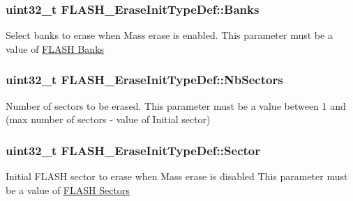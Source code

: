 \subsubsection[{\texorpdfstring{Banks}{Banks}}]{\setlength{\rightskip}{0pt plus 5cm}uint32\+\_\+t F\+L\+A\+S\+H\+\_\+\+Erase\+Init\+Type\+Def\+::\+Banks}\hypertarget{struct_f_l_a_s_h___erase_init_type_def_a9590db921fb8d36daf38e097f68fc14f}{}\label{struct_f_l_a_s_h___erase_init_type_def_a9590db921fb8d36daf38e097f68fc14f}
Select banks to erase when Mass erase is enabled. This parameter must be a value of \hyperlink{group___f_l_a_s_h_ex___banks}{F\+L\+A\+SH Banks} 
\subsubsection[{\texorpdfstring{Nb\+Sectors}{NbSectors}}]{\setlength{\rightskip}{0pt plus 5cm}uint32\+\_\+t F\+L\+A\+S\+H\+\_\+\+Erase\+Init\+Type\+Def\+::\+Nb\+Sectors}\hypertarget{struct_f_l_a_s_h___erase_init_type_def_aec98fec1676cd618e3743158c855a76a}{}\label{struct_f_l_a_s_h___erase_init_type_def_aec98fec1676cd618e3743158c855a76a}
Number of sectors to be erased. This parameter must be a value between 1 and (max number of sectors -\/ value of Initial sector) 
\subsubsection[{\texorpdfstring{Sector}{Sector}}]{\setlength{\rightskip}{0pt plus 5cm}uint32\+\_\+t F\+L\+A\+S\+H\+\_\+\+Erase\+Init\+Type\+Def\+::\+Sector}\hypertarget{struct_f_l_a_s_h___erase_init_type_def_a13bac8f9a1ba504a265b44345ecf4d2b}{}\label{struct_f_l_a_s_h___erase_init_type_def_a13bac8f9a1ba504a265b44345ecf4d2b}
Initial F\+L\+A\+SH sector to erase when Mass erase is disabled This parameter must be a value of \hyperlink{group___f_l_a_s_h_ex___sectors}{F\+L\+A\+SH Sectors} 
